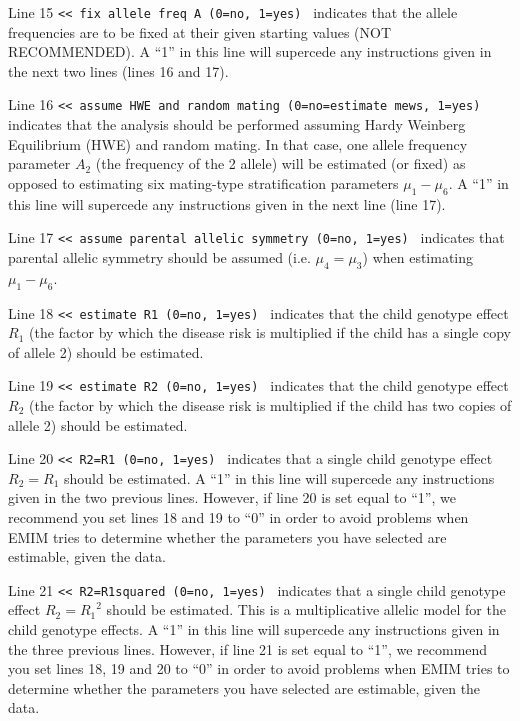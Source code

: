 \documentclass[a4paper,11pt]{report}
\begin{document}
\newpage



Line 15 
{\tt	<< fix allele freq A (0=no, 1=yes)
}
indicates  that the allele frequencies are to be fixed 
at their given starting values (NOT RECOMMENDED). A ``1'' in this line will supercede any instructions given in the next two lines (lines 16 and 17).

Line 16
{\tt	<<  assume HWE and random mating (0=no=estimate mews, 1=yes)
}
indicates that the analysis should be performed assuming Hardy Weinberg Equilibrium (HWE) and random mating. In that case, one allele frequency parameter
$A_2$ (the frequency of the 2 allele) will be estimated (or fixed) as opposed to estimating six mating-type stratification parameters $\mu_1 - \mu_6$.  A ``1'' in this line will supercede any instructions given in the next line (line 17).

Line 17
{\tt	<< assume parental allelic symmetry (0=no, 1=yes)
}
indicates that parental allelic symmetry should be assumed 
(i.e. $\mu_4 = \mu_3$) when estimating  $\mu_1 - \mu_6$.

Line 18
{\tt	<< estimate R1 (0=no, 1=yes)
}
indicates that the child genotype effect $R_1$ (the factor by which the disease risk is multiplied if the child has a single copy of allele 2) should be estimated.

Line 19
{\tt	<< estimate R2 (0=no, 1=yes)
}
indicates that the child genotype effect $R_2$ (the factor by which the disease risk is multiplied if the child has two copies of allele 2) should be estimated.

Line 20
{\tt	<< R2=R1 (0=no, 1=yes)
}
indicates that a single child genotype effect $R_2=R_1$ should be estimated. 
A ``1'' in this line will supercede any instructions given in the two previous lines. However, if line 20 is set equal to ``1'', we recommend you set lines 18 and 19 to ``0'' in order to avoid problems when EMIM tries to determine whether
the parameters you have selected are estimable, given the data.


Line 21
{\tt	<< R2=R1squared	(0=no, 1=yes)
}
indicates that a single child genotype effect $R_2={R_1}^2$ 
should be estimated. This is a multiplicative allelic model
for the child genotype effects.
A ``1'' in this line will supercede any instructions given in the three previous lines. However, if line 21 is set equal to ``1'', we recommend you set lines 18, 19 and 20 
to ``0'' in order to avoid problems when EMIM tries to determine whether
the parameters you have selected are estimable, given the data.
\end{document}

